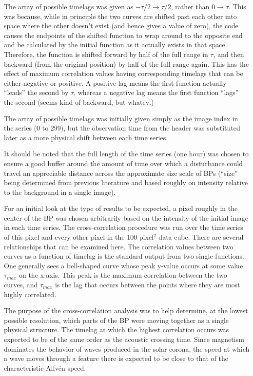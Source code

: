 \documentclass[preprint]{aastex}   %
\begin{document}
The array of possible timelags was given as
$-\tau/2 \rightarrow \tau/2$, rather than
$0 \rightarrow \tau$.
This was because, while in principle the two curves are shifted past each other into
space where the other doesn't exist (and hence gives a value of zero),
the code causes the endpoints of the shifted function to wrap around to the 
opposite end and be calculated by the initial function as it actually exists
in that space. Therefore, the function is shifted forward by half of the full
range in $\tau$, and then backward (from the original position) by half of the full
range again. This has the effect of maximum correlation values having corresponding
timelags that can be either negative or positive. A positive lag means the first
function actually ``leads'' the second by $\tau$, whereas a negative lag means the
first function ``lags'' the second (seems kind of backward, but whatev.)

The array of possible timelags was initially given simply as the image index in
the series (0 to 299), but the observation time from the header was substituted
later as a more physical shift between each time series.

It should be noted that the full length of the time series (one hour) was chosen to
ensure a good buffer around the amount of time over which a disturbance could travel
an appreciable distance across the approximate size scale of BPs (``size'' being
determined from previous literature and based roughly on intensity relative to the
background in a single image).

For an initial look at the type of results to be expected, a pixel roughly in the center
of the BP was chosen arbitrarily based on
the intensity of the initial image in each time series. The cross-correlation procedure was
run over the time series of this pixel and every other pixel in the 100 pixel$^{2}$ data
cube. There are several relationships that can be examined here.
The correlation values between two curves as a function of timelag is the standard
output from two single functions. One generally sees a bell-shaped curve whose
peak y-value occurs at some value $\tau_{max}$ on the x-axis. This peak is the maximum
correlation between the two curves, and $\tau_{max}$ is the lag that occurs between the
points where they are most highly correlated.

The purpose of the cross-correlation analysis was to help
determine, at the lowest possible resolution, which parts of the BP were moving
together as a single physical structure. The timelag at which the highest correlation
occurs was expected to be of the same order as the acoustic crossing time.
Since
magnetism dominates the behavior of waves produced in the solar corona, the
speed at which a wave moves through a feature there is expected
to be close to that of the characteristic Alfv\'en speed.
\end{document}
